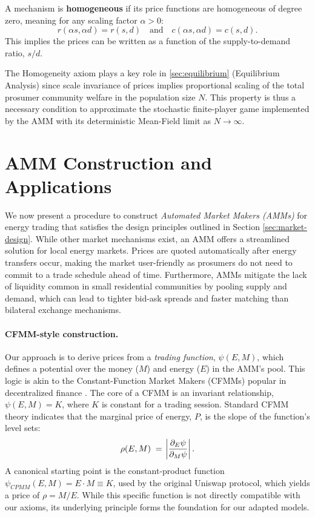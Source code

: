 \documentclass[12pt, notitlepage]{article}
\begin{document}
\begin{axiom}[Homogeneity] \label{ax:homo}
A mechanism is \textbf{homogeneous} if its price functions are homogeneous of degree zero, meaning for any scaling factor $\alpha > 0$:
\begin{equation}
    r(\alpha s, \alpha d) = r(s,d) \quad \text{and} \quad c(\alpha s, \alpha d) = c(s,d).
\end{equation}
This implies the prices can be written as a function of the supply-to-demand ratio, $s/d$.
\end{axiom}

The Homogeneity axiom plays a key role in \cref{sec:equilibrium} (Equilibrium Analysis) since scale invariance of prices implies proportional scaling of the total prosumer community welfare in the population size $N$. This property is thus a necessary condition to approximate the stochastic finite-player game implemented by the AMM with its deterministic Mean-Field limit as $N \to \infty$.

\section{AMM Construction and Applications}
\label{AMM-construction}

We now present a procedure to construct \emph{Automated Market Makers (AMMs)} for energy trading that satisfies the design principles outlined in Section \ref{sec:market-design}. While other market mechanisms exist, an AMM offers a streamlined solution for local energy markets. Prices are quoted automatically after energy transfers occur, making the market user-friendly as prosumers do not need to commit to a trade schedule ahead of time. Furthermore, AMMs mitigate the lack of liquidity common in small residential communities by pooling supply and demand, which can lead to tighter bid-ask spreads and faster matching than bilateral exchange mechanisms.

\paragraph{CFMM-style construction.} Our approach is to derive prices from a \textit{trading function}, $\psi(E,M)$, which defines a potential over the money ($M$) and energy ($E$) in the AMM's pool. This logic is akin to the Constant-Function Market Makers (CFMMs) popular in decentralized finance \citep[e.g.,][]{AngerisChitra2020AFT,AngerisEtAl2022Handbook}. The core of a CFMM is an invariant relationship, $\psi(E,M) = K$, where $K$ is constant for a trading session. Standard CFMM theory indicates that the marginal price of energy, $P$, is the slope of the function's level sets:
\[
\rho(E,M) \;=\; \abs{\frac{\partial_E \psi}{\partial_M \psi}}.
\]
A canonical starting point is the constant-product function $\psi_{CPMM}(E,M) = E \cdot M \equiv K$, used by the original Uniswap protocol, which yields a price of $\rho=M/E$. While this specific function is not directly compatible with our axioms, its underlying principle forms the foundation for our adapted models.
\end{document}
